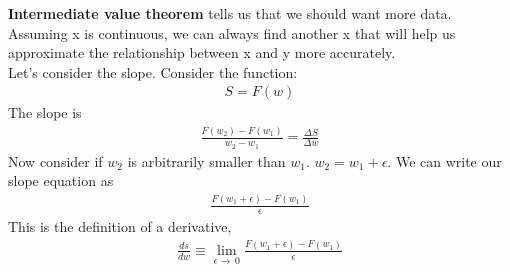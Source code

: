 \documentclass{article}
\begin{document}
\textbf{Intermediate value theorem} tells us that we should want more data. Assuming x is continuous, we can always find another x that will help us approximate the relationship between x and y more accurately. \\

Let's consider the slope. Consider the function: 
\begin{align}
    S = F(w) 
\end{align}
The slope is 
\begin{align*}
    \frac{F(w_2) - F(w_1)}{w_2-w_1} = \frac{\Delta S}{ \Delta w}
\end{align*}
Now consider if $w_2$ is arbitrarily smaller than $w_1$. $w_2 = w_1 + \epsilon$. We can write our slope equation as 
\begin{align*}
    \frac{F(w_1 + \epsilon) - F(w_1)}{\epsilon}
\end{align*}
This is the definition of a derivative, 
\begin{align*}
    \frac{ds}{dw} \equiv \lim_{\epsilon \to \ 0} \frac{F(w_1 + \epsilon) - F(w_1)}{\epsilon}
\end{align*}
\end{document}
